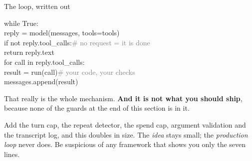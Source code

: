 \documentclass[aspectratio=169]{beamer}
\newcommand{\watchbox}[1]{%
  \begin{tcolorbox}[colback=armorange!12, colframe=armorange, boxrule=0.6pt, arc=2pt]
  #1
  \end{tcolorbox}}
\newcommand{\codebox}[1]{%
  \begin{center}
  \begin{tcolorbox}[colback=lightbg, colframe=gray, boxrule=0.5pt, arc=2pt,
                    width=0.94\textwidth, left=4pt, right=4pt, top=3pt, bottom=3pt]
    \ttfamily\scriptsize #1
  \end{tcolorbox}
  \end{center}}
\begin{document}
\begin{frame}{The loop, written out}
  \vspace{0.5em}
  \codebox{while True:\\
  \hspace*{1em}reply = model(messages, tools=tools)\\
  \hspace*{1em}if not reply.tool\_calls:\qquad\textcolor{gray}{\# no request = it is done}\\
  \hspace*{2em}return reply.text\\
  \hspace*{1em}for call in reply.tool\_calls:\\
  \hspace*{2em}result = run(call)\qquad\quad\textcolor{gray}{\# your code, your checks}\\
  \hspace*{2em}messages.append(result)}

  \vspace{0.5em}
  That really is the whole mechanism. \textbf{And it is not what you should ship}, because
  none of the guards at the end of this section is in it.

  \vspace{0.6em}
  \watchbox{\small Add the turn cap, the repeat detector, the spend cap, argument validation and
  the transcript log, and this doubles in size. The \emph{idea} stays small; the
  \emph{production loop} never does. Be suspicious of any framework that shows you only the
  seven lines.}
\end{frame}
\end{document}
